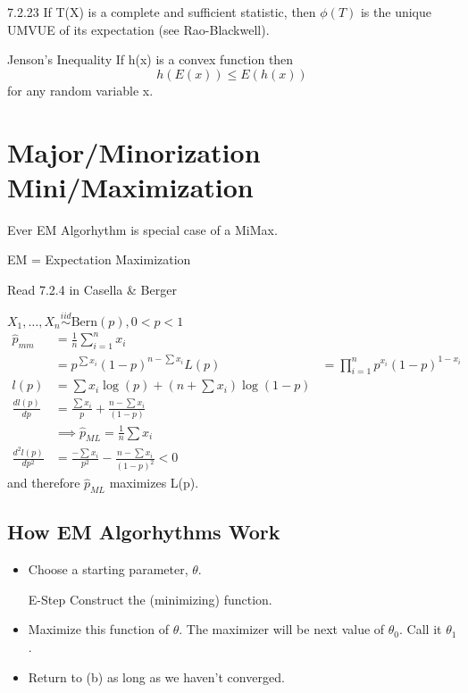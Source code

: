 \documentclass[11pt,fleqn]{book} %
\begin{document}
 \begin{theorem}{7.2.23}
 	If T(X) is a complete and sufficient statistic, then $\phi(T)$ is the unique UMVUE of its expectation (see Rao-Blackwell).
 \end{theorem}

 \begin{definition}{Jenson's Inequality}
 If h(x) is a convex function then 
 $$h(E(x))\le E(h(x)) $$
for any random variable x.  	
 \end{definition}


\section{Major/Minorization Mini/Maximization}

Ever EM Algorhythm is special case of a MiMax.

EM = Expectation Maximization

\begin{remark}
	Read 7.2.4 in Casella \& Berger
\end{remark}

\begin{example}
	$X_1, \dots, X_n \stackrel{iid}{\sim} \text{Bern}(p), 0<p<1$
	\begin{align*}
		\hat{p}_{mm} &= \frac{1}{n} \sum \limits^n_{i=1} x_i\\
			&= p^{\sum x_i} (1-p)^{n - \sum x_i}
		L(p) &= \prod\limits^n_{i=1} p^{x_i} (1-p)^{1-x_i}\\
		l(p) &= \sum x_i \log(p) + (n + \sum x_i) \log(1-p)\\
		\frac{d l(p)}{dp} &= \frac{\sum x_i}{p} + \frac{n - \sum x_i}{(1-p)}\\
			&\implies \hat{p}_{ML} = \frac{1}{n}\sum x_i\\
		\frac{d^2 l(p)}{dp^2} &= \frac{- \sum x_i}{p^2} - \frac{n - \sum x_i}{(1-p)^2} < 0
	\end{align*}
	and therefore $\hat{p}_{ML}$ maximizes L(p).
\end{example}

\subsection{How EM Algorhythms Work}
\begin{itemize}
	\item Choose a starting parameter, $\theta$. 
	\item [E-Step] Construct the (minimizing) function.
	\item Maximize this function of $\theta$. The maximizer will be next value of $\theta_0$. Call it $\theta_1$. 
	\item Return to (b) as long as we haven't converged.   
\end{itemize}
\end{document}
